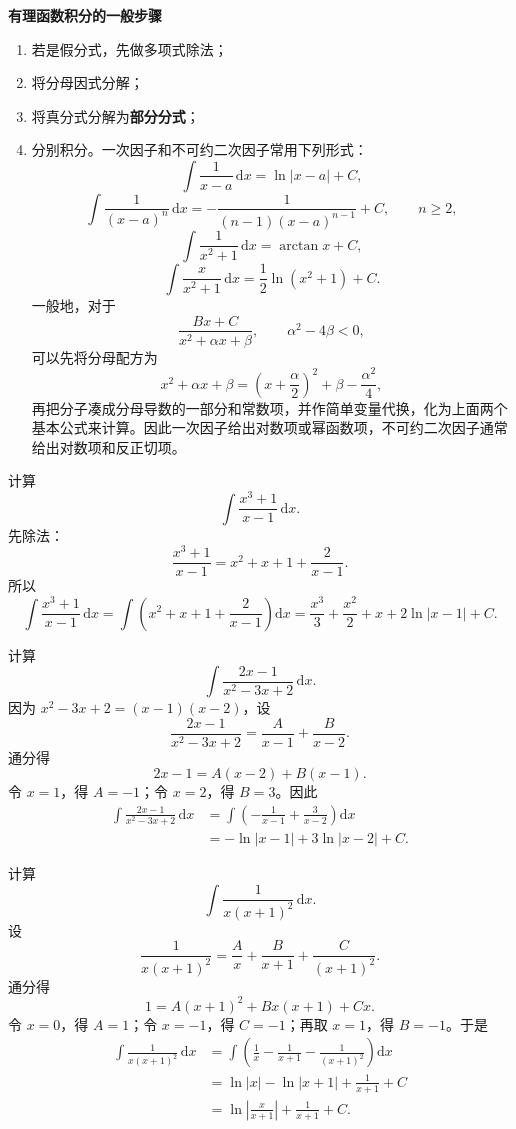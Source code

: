 \documentclass[fontset=fandol]{ctexart}
\newenvironment{custom}[1]{\par\noindent\textbf{#1}\quad}{\par\vspace{0.8em}}
\newcommand{\dd}{\mathrm{d}}
\begin{document}
\begin{custom}{有理函数积分的一般步骤}
\begin{enumerate}
\item 若是假分式，先做多项式除法；
\item 将分母因式分解；
\item 将真分式分解为\textbf{部分分式}；
\item 分别积分。一次因子和不可约二次因子常用下列形式：
\[
\int\frac{1}{x-a}\,\dd x=\ln|x-a|+C,
\]
\[
\int\frac{1}{(x-a)^n}\,\dd x
=-\frac{1}{(n-1)(x-a)^{n-1}}+C,\qquad n\geq2,
\]
\[
\int\frac{1}{x^2+1}\,\dd x=\arctan x+C,
\]
\[
\int\frac{x}{x^2+1}\,\dd x=\frac12\ln(x^2+1)+C.
\]
一般地，对于
\[
\frac{Bx+C}{x^2+\alpha x+\beta},\qquad \alpha^2-4\beta<0,
\]
可以先将分母配方为
\[
x^2+\alpha x+\beta=\left(x+\frac{\alpha}{2}\right)^2+\beta-\frac{\alpha^2}{4},
\]
再把分子凑成分母导数的一部分和常数项，并作简单变量代换，化为上面两个基本公式来计算。因此一次因子给出对数项或幂函数项，不可约二次因子通常给出对数项和反正切项。
\end{enumerate}
\end{custom}

\begin{example}[先做多项式除法]
计算
\[
\int \frac{x^3+1}{x-1}\,\dd x.
\]
先除法：
\[
\frac{x^3+1}{x-1}=x^2+x+1+\frac{2}{x-1}.
\]
所以
\[
\int \frac{x^3+1}{x-1}\,\dd x
=\int\left(x^2+x+1+\frac{2}{x-1}\right)\dd x
=\frac{x^3}{3}+\frac{x^2}{2}+x+2\ln|x-1|+C.
\]
\end{example}

\begin{example}[不同一次因子]
计算
\[
\int \frac{2x-1}{x^2-3x+2}\,\dd x.
\]
因为 $x^2-3x+2=(x-1)(x-2)$，设
\[
\frac{2x-1}{x^2-3x+2}=\frac{A}{x-1}+\frac{B}{x-2}.
\]
通分得
\[
2x-1=A(x-2)+B(x-1).
\]
令 $x=1$，得 $A=-1$；令 $x=2$，得 $B=3$。因此
\[
\begin{aligned}
\int \frac{2x-1}{x^2-3x+2}\,\dd x
&=\int\left(-\frac1{x-1}+\frac3{x-2}\right)\dd x\\
&=-\ln|x-1|+3\ln|x-2|+C.
\end{aligned}
\]
\end{example}

\begin{example}[重复一次因子]
计算
\[
\int \frac{1}{x(x+1)^2}\,\dd x.
\]
设
\[
\frac{1}{x(x+1)^2}=\frac{A}{x}+\frac{B}{x+1}+\frac{C}{(x+1)^2}.
\]
通分得
\[
1=A(x+1)^2+Bx(x+1)+Cx.
\]
令 $x=0$，得 $A=1$；令 $x=-1$，得 $C=-1$；再取 $x=1$，得 $B=-1$。于是
\[
\begin{aligned}
\int \frac{1}{x(x+1)^2}\,\dd x
&=\int\left(\frac1x-\frac1{x+1}-\frac1{(x+1)^2}\right)\dd x\\
&=\ln|x|-\ln|x+1|+\frac1{x+1}+C\\
&=\ln\left|\frac{x}{x+1}\right|+\frac1{x+1}+C.
\end{aligned}
\]
\end{example}
\end{document}
